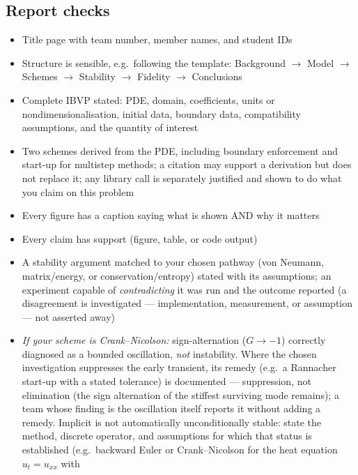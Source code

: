 \documentclass[11pt]{article}
\begin{document}
\subsection*{Report checks}
\begin{itemize}[leftmargin=2.4em, itemsep=1pt]
  \item[$\square$] Title page with team number, member names, and student IDs
  \item[$\square$] Structure is sensible, e.g.\ following the template:
    Background $\to$ Model $\to$ Schemes $\to$ Stability $\to$ Fidelity $\to$
    Conclusions
  \item[$\square$] Complete IBVP stated: PDE, domain, coefficients, units or
    nondimensionalisation, initial data, boundary data, compatibility
    assumptions, and the quantity of interest
  \item[$\square$] Two schemes derived from the PDE, including
    boundary enforcement and start-up for multistep methods; a citation may
    support a derivation but does not replace it; any library call is
    separately justified and shown to do what you claim on this problem
  \item[$\square$] Every figure has a caption saying what is shown AND why it matters
  \item[$\square$] Every claim has support (figure, table, or code output)
  \item[$\square$] A stability argument matched to your chosen pathway (von
    Neumann, matrix/energy, or conservation/entropy) stated with its
    assumptions; an experiment capable of \emph{contradicting} it was run
    and the outcome reported (a disagreement is investigated ---
    implementation, measurement, or assumption --- not asserted away)
  \item[$\square$] \emph{If your scheme is Crank--Nicolson:}
    sign-alternation ($G \to -1$) correctly diagnosed as a bounded
    oscillation, \emph{not} instability. Where the chosen investigation
    suppresses the early transient, its remedy (e.g.\ a Rannacher
    start-up with a stated tolerance) is documented --- suppression,
    not elimination (the sign alternation of the stiffest surviving
    mode remains); a team whose finding is the oscillation itself
    reports it without adding a remedy. Implicit is not automatically
    unconditionally stable: state the method, discrete operator, and
    assumptions for which that status is established (e.g.\ backward
    Euler or Crank--Nicolson for the heat equation $u_t = u_{xx}$ with

\end{itemize}
\end{document}
